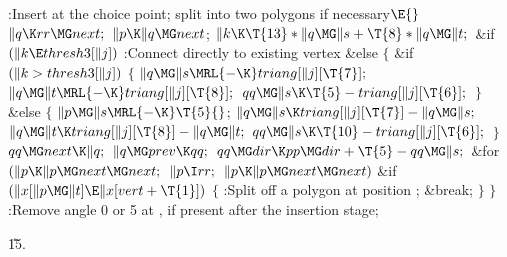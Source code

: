 \Y\B\4:Insert  at the choice point; split into two polygons if
necessary\X${}\E{}$\6
$\|q\K\\{rr}\MG\\{next};{}$\6
${}\|p\K\|q\MG\\{next}{}$;\6
${}\|k\K\T{13}*\|q\MG\|s+\T{8}*\|q\MG\|t;{}$\6
\&{if} ${}(\|k\E\\{thresh3}[\|j]){}$\1\5
:Connect  directly to existing vertex \X\2\6
\&{else}\5
${}\{{}$\1\6
\&{if} ${}(\|k>\\{thresh3}[\|j]){}$\5
${}\{{}$\1\6
${}\|q\MG\|s\MRL{-{\K}}\\{triang}[\|j][\T{7}];{}$\6
${}\|q\MG\|t\MRL{-{\K}}\\{triang}[\|j][\T{8}];{}$\6
${}\\{qq}\MG\|s\K\T{5}-\\{triang}[\|j][\T{6}];{}$\6
\4${}\}{}$\2\6
\&{else}\5
${}\{{}$\1\6
${}\|p\MG\|s\MRL{-{\K}}\T{5}{}$;\6
${}\|q\MG\|s\K\\{triang}[\|j][\T{7}]-\|q\MG\|s;{}$\6
${}\|q\MG\|t\K\\{triang}[\|j][\T{8}]-\|q\MG\|t;{}$\6
${}\\{qq}\MG\|s\K\T{10}-\\{triang}[\|j][\T{6}];{}$\6
\4${}\}{}$\2\6
${}\\{qq}\MG\\{next}\K\|q;{}$\6
${}\|q\MG\\{prev}\K\\{qq};{}$\6
${}\\{qq}\MG\\{dir}\K\\{pp}\MG\\{dir}+\T{5}-\\{qq}\MG\|s;{}$\6
\&{for} ${}(\|p\K\|p\MG\\{next}\MG\\{next};{}$ ${}\|p\I\\{rr};{}$ ${}\|p\K\|p%
\MG\\{next}\MG\\{next}){}$\1\6
\&{if} ${}(\|x[\|p\MG\|t]\E\|x[\\{vert}+\T{1}]){}$\5
${}\{{}$\1\6
:Split off a polygon at position \X;\6
\&{break};\6
\4${}\}{}$\2\2\6
\4${}\}{}$\2\6
:Remove angle 0 or 5 at , if present after the 
insertion stage\X;\par
\U15.\fi

